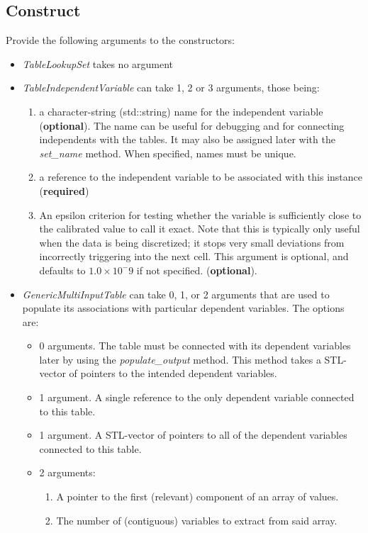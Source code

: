 \documentclass[11pt,fleqn]{report}
\begin{document}
\subsection{Construct}
Provide the following arguments to the constructors:
\begin{itemize}
 \item \textit{TableLookupSet} takes no argument
 \item \textit{TableIndependentVariable} can take 1, 2 or 3 arguments,
 those being:
\begin{enumerate}
 \item a character-string (std::string) name for the independent variable
  (\textbf{optional}).  The name can be useful for debugging and for
  connecting independents with the tables.  It may also be assigned
  later with the \textit{set\_name} method.  When specified,
  names must be unique.
 \item a reference to the independent variable to be associated with
       this instance (\textbf{required})
 \item An epsilon criterion for testing whether the variable is
  sufficiently close to the calibrated value to call it exact.
  Note that this is typically only useful when the data is being
  discretized; it stops very small deviations from incorrectly triggering
  into the next cell.  This argument is optional, and defaults to
  $1.0 \times 10^-9$ if not specified.  (\textbf{optional}).
\end{enumerate}

 \item \textit{GenericMultiInputTable} can take 0, 1, or 2 arguments that
  are used to populate its associations with particular dependent variables.
  The options are:
 \begin{itemize}
 \item 0 arguments.  The table must be connected with its dependent
  variables later by using the \textit{populate\_output} method.
  This method takes a
  STL-vector of pointers to the intended dependent variables.
 \item 1 argument.  A single reference to the only dependent variable
  connected to this table.
 \item 1 argument. A STL-vector of pointers to all of the dependent variables
  connected to this table.
 \item 2 arguments:
  \begin{enumerate}
   \item A pointer to the first (relevant) component of an array of values.
   \item The number of (contiguous) variables to extract from said array.
  \end{enumerate}
 \end{itemize}
\end{itemize}
\end{document}
